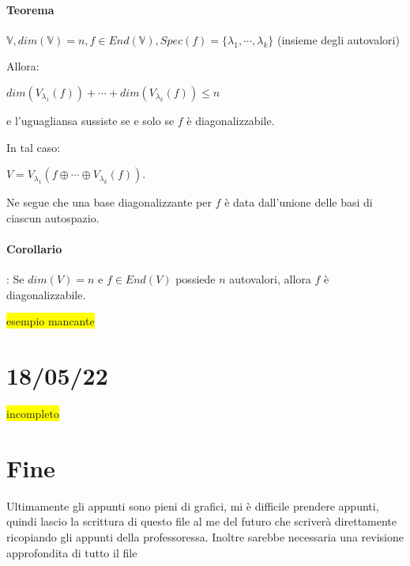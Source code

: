 \documentclass{article}
\newcommand{\hl}[1]{\colorbox{yellow}{#1}}
\newcommand{\V}{\mathbb{V}}
\begin{document}
	\paragraph*{Teorema} $\V, dim(\V)=n,f\in End(\V),Spec(f)=\{\lambda_1,\cdots,\lambda_k\}$ (insieme degli autovalori)

	Allora:

$dim(V_{\lambda_1}(f))+\cdots+dim(V_{\lambda_k}(f))\le n$

	e l'uguagliansa sussiste se e solo se $f$ è diagonalizzabile.

	In tal caso:

$V=V_{\lambda_1}(f\oplus\cdots\oplus V_{\lambda_k}(f))$.

	Ne segue che una base diagonalizzante per $f$ è data dall'unione delle basi di ciascun autospazio.

	\paragraph*{Corollario}: Se $dim(V)=n$ e $f\in End(V)$ possiede $n$ autovalori, allora $f$ è diagonalizzabile.

\hl{esempio mancante}
\section{18/05/22}
\hl{incompleto}
\section*{Fine}
Ultimamente gli appunti sono pieni di grafici, mi è difficile prendere appunti, quindi lascio la scrittura di questo file al me del futuro che scriverà direttamente ricopiando gli appunti della professoressa.
Inoltre sarebbe necessaria una revisione approfondita di tutto il file
\end{document}
